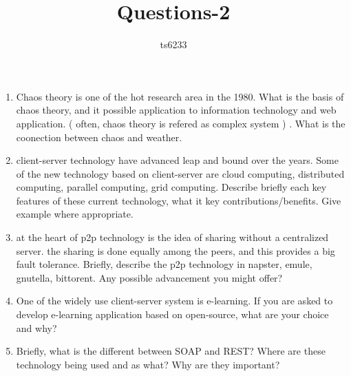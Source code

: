 \documentclass[12pt]{article}
\title{Questions-2}
\author{ts6233}
\date{}
\begin{document}
\begin{enumerate}

\item Chaos theory is one of the hot research area in the 1980. What is the basis of chaos theory, and it possible application to information technology and web application. ( often, chaos theory is refered as complex system ) . What is the coonection between chaos and weather.


\item client-server technology have advanced leap and bound over the years. Some of the new technology based on client-server are cloud computing, distributed computing, parallel computing, grid computing. Describe briefly each key features of these current technology, what it key contributions/benefits. Give example where appropriate.

\item at the heart of p2p technology is the idea of sharing without a centralized server. the sharing is done equally among the peers, and this provides a big fault tolerance. Briefly, describe the p2p technology in napster, emule, gnutella, bittorent. Any possible advancement you might offer?



\item One of the widely use client-server system is e-learning. If you are asked to develop e-learning application based on open-source, what are your choice and why?

\item Briefly, what is the different between SOAP and REST? Where are these technology being used and as what? Why are they important?


\end{enumerate}
\end{document}
